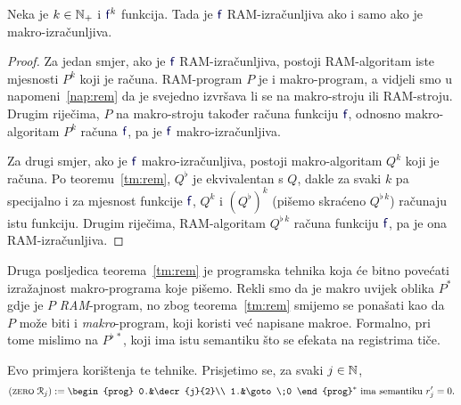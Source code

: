 \begin{korolar}[{name=[RAM-izračunljivost je ekvivalentna makro-izračunljivosti]}]\label{kor:rem}
Neka je $k\in{\mathbb N}_+$ i $\f f^k$ funkcija. Tada je $\f f$ RAM-izračunljiva ako i samo ako je makro-izračunljiva.
\end{korolar}
\begin{proof}
Za jedan smjer, ako je $\f f$ RAM-izračunljiva, postoji RAM-algoritam iste mjesnosti $P^k$ koji je računa.  RAM-program $P$ je i makro-program, a vidjeli smo u napomeni~\ref{nap:rem} da je svejedno izvršava li se na makro-stroju ili RAM-stroju. Drugim riječima, $P$ na makro-stroju također računa funkciju $\f f$, odnosno makro-algoritam $P^k$ računa $\f f$, pa je $\f f$ makro-izračunljiva.

Za drugi smjer, ako je $\f f$ makro-izračunljiva, postoji makro-algoritam $Q^k$ koji je računa. Po teoremu~\ref{tm:rem}, $Q^\flat$ je ekvivalentan s $Q$, dakle za svaki $k$ pa specijalno i za mjesnost funkcije $\f f$, $Q^k$ i $(Q^\flat)^k$ (pišemo skraćeno $Q^{\flat\,k}$) računaju istu funkciju. Drugim riječima, RAM-algoritam $Q^{\flat\,k}$ računa funkciju $\f f$, pa je ona RAM-izračunljiva.
\end{proof}

\begin{napomena}[{name=[makroi višeg reda]}]
Druga posljedica teorema~\ref{tm:rem} je programska tehnika koja će bitno povećati izražajnost makro-programa koje pišemo. Rekli smo da je makro uvijek oblika $P^*$ gdje je $P$ \emph{RAM}-program, no zbog teorema~\ref{tm:rem} smijemo se ponašati kao da $P$ može biti i \emph{makro}-program, koji koristi već napisane makroe. Formalno, pri tome mislimo na $P^{\flat\,*}$\!, koji ima istu semantiku što se efekata na registrima tiče.
\end{napomena}


Evo primjera korištenja te tehnike. Prisjetimo se, za svaki $j\in{\mathbb N}$,
\begin{equation}
(\textsc{zero}\;\reg{j}):=\begin{prog}
0.&\decr{j}{2}\\
1.&\goto\;0
\end{prog}^*\text{
 ima semantiku $r_j'=0$.}
\end{equation}


